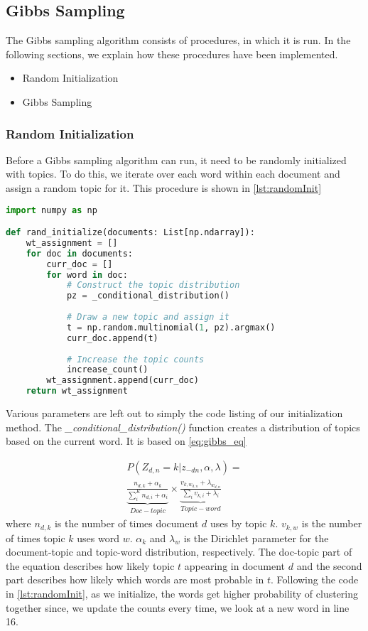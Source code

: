 \subsection{Gibbs Sampling}\label{sec:appendix_gibbs}
The Gibbs sampling algorithm consists of procedures, in which it is run.
In the following sections, we explain how these procedures have been implemented.
\begin{itemize}
	\item Random Initialization
	\item Gibbs Sampling
\end{itemize}

\subsubsection{Random Initialization}
Before a Gibbs sampling algorithm can run, it need to be randomly initialized with topics.
To do this, we iterate over each word within each document and assign a random topic for it.
This procedure is shown in \autoref{lst:randomInit}
\begin{lstlisting}[language=Python, caption=Random Initialization,label={lst:randomInit}]
import numpy as np

def rand_initialize(documents: List[np.ndarray]):
	wt_assignment = []
	for doc in documents:
		curr_doc = []
		for word in doc:
			# Construct the topic distribution
			pz = _conditional_distribution()
			
			# Draw a new topic and assign it
			t = np.random.multinomial(1, pz).argmax()
			curr_doc.append(t)
			
			# Increase the topic counts
			increase_count()
		wt_assignment.append(curr_doc)
	return wt_assignment
\end{lstlisting}

Various parameters are left out to simply the code listing of our initialization method.
The \emph{\_conditional\_distribution()} function creates a distribution of topics based on the current word.
It is based on \autoref{eq:gibbs_eq}

\begin{equation}\label{eq:gibbs_eq}
	\begin{split}
		P(Z_{d,n} = k |z_{-dn}, \alpha, \lambda) = \\
		\underbrace{\frac{n_{d,k} + \alpha_{k}}{\sum_{i}^{K} n_{d,i} + \alpha_i}}_{Doc-topic} \times
		\underbrace{\frac{v_{k, w_{d,n}} + \lambda_{w_{d,n}}}{\sum_{i} v_{k,i} + \lambda_i}}_{Topic-word}
	\end{split}
\end{equation}
where $n_{d,k}$ is the number of times document $d$ uses by topic $k$.
$v_{k,w}$ is the number of times topic $k$ uses word $w$.
$\alpha_k$ and $\lambda_w$ is the Dirichlet parameter for the document-topic and topic-word distribution, respectively.
The doc-topic part of the equation describes how likely topic $t$ appearing in document $d$ and the second part describes how likely which words are most probable in $t$.
Following the code in \autoref{lst:randomInit}, as we initialize, the words get higher probability of clustering together since, we update the counts every time, we look at a new word in line 16.

